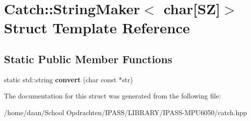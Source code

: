 \hypertarget{structCatch_1_1StringMaker_3_01char[SZ]_4}{}\section{Catch\+:\+:String\+Maker$<$ char\mbox{[}SZ\mbox{]}$>$ Struct Template Reference}
\label{structCatch_1_1StringMaker_3_01char[SZ]_4}
\subsection*{Static Public Member Functions}
\begin{DoxyCompactItemize}
\item 
\mbox{\label{structCatch_1_1StringMaker_3_01char[SZ]_4_a095e415534f9145300271befe9853357}} 
static std\+::string {\bfseries convert} (char const $\ast$str)
\end{DoxyCompactItemize}


The documentation for this struct was generated from the following file\+:\begin{DoxyCompactItemize}
\item 
/home/daan/\+School Opdrachten/\+I\+P\+A\+S\+S/\+L\+I\+B\+R\+A\+R\+Y/\+I\+P\+A\+S\+S-\/\+M\+P\+U6050/catch.\+hpp\end{DoxyCompactItemize}
